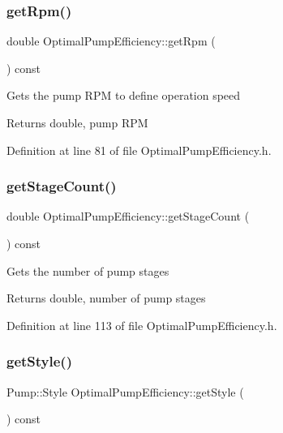 \subsubsection{\texorpdfstring{get\+Rpm()}{getRpm()}}
{\footnotesize\ttfamily double Optimal\+Pump\+Efficiency\+::get\+Rpm (\begin{DoxyParamCaption}{ }\end{DoxyParamCaption}) const\hspace{0.3cm}{\ttfamily [inline]}}

Gets the pump R\+PM to define operation speed \begin{DoxyReturn}{Returns}
double, pump R\+PM 
\end{DoxyReturn}


Definition at line 81 of file Optimal\+Pump\+Efficiency.\+h.

\mbox{\label{class_optimal_pump_efficiency_aac0c1a4a6492bf00b245c2a61d100eaa}} 
\subsubsection{\texorpdfstring{get\+Stage\+Count()}{getStageCount()}}
{\footnotesize\ttfamily double Optimal\+Pump\+Efficiency\+::get\+Stage\+Count (\begin{DoxyParamCaption}{ }\end{DoxyParamCaption}) const\hspace{0.3cm}{\ttfamily [inline]}}

Gets the number of pump stages \begin{DoxyReturn}{Returns}
double, number of pump stages 
\end{DoxyReturn}


Definition at line 113 of file Optimal\+Pump\+Efficiency.\+h.

\mbox{\label{class_optimal_pump_efficiency_a601fe15e9acc23112743fabe417030fb}} 
\subsubsection{\texorpdfstring{get\+Style()}{getStyle()}}
{\footnotesize\ttfamily Pump\+::\+Style Optimal\+Pump\+Efficiency\+::get\+Style (\begin{DoxyParamCaption}{ }\end{DoxyParamCaption}) const\hspace{0.3cm}{\ttfamily [inline]}}

